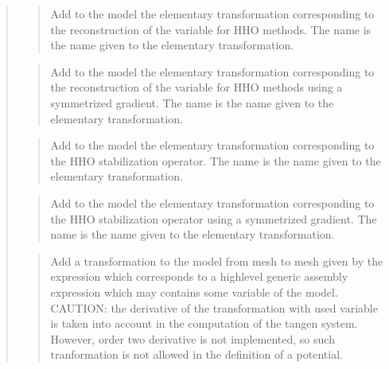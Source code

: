 \documentclass[a4paper,11pt,english]{sphinxmanual}
\begin{document}
\begin{quote}
\begin{quote}
\sphinxAtStartPar
Add to the model the elementary transformation corresponding to the
reconstruction of the variable for HHO methods.
The name is the name given to the elementary transformation.
\end{quote}

\sphinxAtStartPar
{}
\begin{quote}

\sphinxAtStartPar
Add to the model the elementary transformation corresponding to the
reconstruction of the variable for HHO methods using a symmetrized
gradient.
The name is the name given to the elementary transformation.
\end{quote}

\sphinxAtStartPar
{}
\begin{quote}

\sphinxAtStartPar
Add to the model the elementary transformation corresponding to the
HHO stabilization operator.
The name is the name given to the elementary transformation.
\end{quote}

\sphinxAtStartPar
{}
\begin{quote}

\sphinxAtStartPar
Add to the model the elementary transformation corresponding to the
HHO stabilization operator using a symmetrized gradient.
The name is the name given to the elementary transformation.
\end{quote}

\sphinxAtStartPar
{}
\begin{quote}

\sphinxAtStartPar
Add a transformation to the model from mesh  to mesh
 given by the expression  which corresponds to a
high\sphinxhyphen{}level generic assembly expression which may contains some
variable of the model. CAUTION: the derivative of the
transformation with used variable is taken into account in the
computation of the tangen system. However, order two derivative is not
implemented, so such tranformation is not allowed in the definition
of a potential.
\end{quote}


\end{quote}
\end{document}
